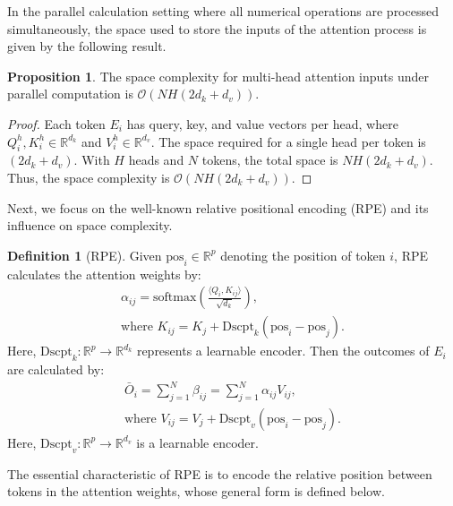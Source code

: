 \documentclass[lettersize,journal]{IEEEtran}
\theoremstyle{definition}
\newtheorem{proposition}{Proposition}
\newtheorem{definition}{Definition}
\begin{document}
In the parallel calculation setting where all numerical operations are processed simultaneously, the space used to store the inputs of the attention process is given by the following result.

\begin{proposition}
\label{prop:mha_space}
The space complexity for multi-head attention inputs under parallel computation is \(\mathcal{O}(NH(2d_k+d_v))\).
\end{proposition}

\begin{proof}
Each token $E_i$ has query, key, and value vectors per head, where $Q_i^h, K_i^h \in \mathbb{R}^{d_k}$ and $V_i^h \in \mathbb{R}^{d_v}$. The space required for a single head per token is $(2d_k + d_v)$. With $H$ heads and $N$ tokens, the total space is $N H (2d_k + d_v)$. Thus, the space complexity is $\mathcal{O}(NH(2d_k + d_v))$.
\end{proof}

Next, we focus on the well-known relative positional encoding (RPE) and its influence on space complexity.

\begin{definition}[RPE]
\label{def:RPE}
Given $\text{pos}_i\in \mathbb{R}^{p}$ denoting the position of token $i$, RPE calculates the attention weights by:
\begin{gather}
    \alpha_{ij} = \mathrm{softmax} \left(
  \frac{\langle Q_i, K_{ij} \rangle}{\sqrt{d_k}}
\right), \label{eq:rpe_attention}\\
\text{where } K_{ij} = K_j + \text{Dscpt}_k(\text{pos}_i-\text{pos}_j). \label{eq:rpe_k_embedding}
\end{gather}
Here, $\text{Dscpt}_k: \mathbb{R}^p \rightarrow \mathbb{R}^{d_k}$ represents a learnable encoder.
Then the outcomes of $E_i$ are calculated by:
\begin{gather}
    \bar{O}_i = \sum_{j=1}^N \beta_{ij} = \sum_{j=1}^{N} \alpha_{ij} V_{ij},\label{eq:rpe_weighted_sum}\\
    \text{where }V_{ij} = V_j + \text{Dscpt}_v(\text{pos}_i-\text{pos}_j). \label{eq:rpe_v_embedding}
\end{gather}
Here, $\text{Dscpt}_v:\mathbb{R}^p \rightarrow \mathbb{R}^{d_v}$ is a learnable encoder.

\end{definition}

The essential characteristic of RPE is to encode the relative position between tokens in the attention weights, whose general form is defined below.
\end{document}
